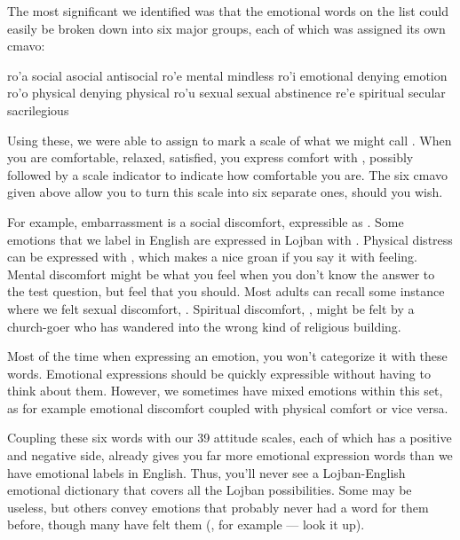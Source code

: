 The most significant  we identified was
    that the emotional words on the list could easily be broken
    down into six major groups, each of which was assigned its own
    cmavo:

   ro'a    social      asocial     antisocial
    ro'e    mental              mindless
    ro'i    emotional           denying emotion
    ro'o    physical            denying physical
    ro'u    sexual              sexual abstinence
    re'e    spiritual   secular     sacrilegious

Using these, we were able to assign  to mark a scale
    of what we might call . When you are
    comfortable, relaxed, satisfied, you express comfort with
    , possibly followed by a scale indicator to indicate how
    comfortable you are. The six cmavo given above allow you to
    turn this scale into six separate ones, should you wish.

For example, embarrassment is a social discomfort,
    expressible as . Some emotions that we label
     in English are expressed in Lojban with
    . Physical distress can be expressed with
    , which makes a nice groan if you say it with
    feeling. Mental discomfort might be what you feel when you
    don't know the answer to the test question, but feel that you
    should. Most adults can recall some instance where we felt
    sexual discomfort, . Spiritual discomfort,
    , might be felt by a church-goer who has wandered
    into the wrong kind of religious building.

Most of the time when expressing an emotion, you won't
    categorize it with these words. Emotional expressions should be
    quickly expressible without having to think about them.
    However, we sometimes have mixed emotions within this set, as
    for example emotional discomfort coupled with physical comfort
    or vice versa.

Coupling these six words with our 39 attitude scales, each
    of which has a positive and negative side, already gives you
    far more emotional expression words than we have emotional
    labels in English. Thus, you'll never see a Lojban-English
    emotional dictionary that covers all the Lojban possibilities.
    Some may be useless, but others convey emotions that probably
    never had a word for them before, though many have felt them
    (, for example --- look it up).

